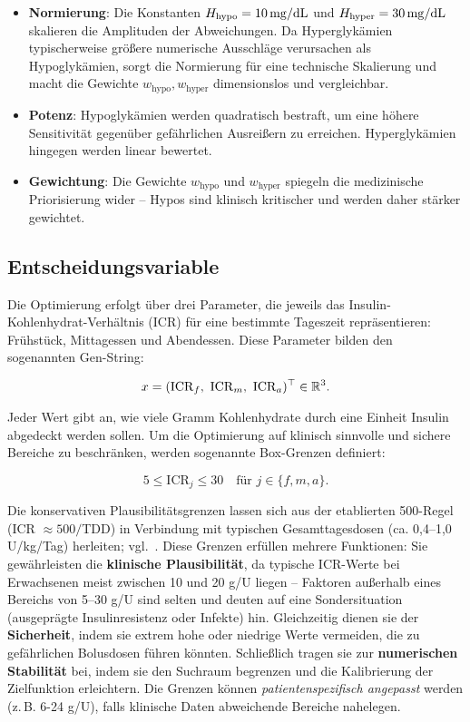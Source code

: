 \begin{itemize}
    \item \textbf{Normierung}: Die Konstanten \(H_{\text{hypo}} = 10\,\mathrm{mg/dL}\) und \(H_{\text{hyper}} = 30\,\mathrm{mg/dL}\) skalieren die Amplituden der Abweichungen. Da Hyperglykämien typischerweise größere numerische Ausschläge verursachen als Hypoglykämien, sorgt die Normierung für eine technische Skalierung und macht die Gewichte \(w_{\mathrm{hypo}}, w_{\mathrm{hyper}}\) dimensionslos und vergleichbar.
    \item \textbf{Potenz}: Hypoglykämien werden quadratisch bestraft, um eine höhere Sensitivität gegenüber gefährlichen Ausreißern zu erreichen. Hyperglykämien hingegen werden linear bewertet.
    \item \textbf{Gewichtung}: Die Gewichte \(w_{\mathrm{hypo}}\) und \(w_{\mathrm{hyper}}\) spiegeln die medizinische Priorisierung wider – Hypos sind klinisch kritischer und werden daher stärker gewichtet.
\end{itemize}

\subsection{Entscheidungsvariable}

Die Optimierung erfolgt über drei Parameter, die jeweils das Insulin-Kohlenhydrat-Verhältnis (ICR) für eine bestimmte Tageszeit repräsentieren: Frühstück, Mittagessen und Abendessen. Diese Parameter bilden den sogenannten Gen-String:

\[
x = (\mathrm{ICR}_f,\ \mathrm{ICR}_m,\ \mathrm{ICR}_a)^\top \in \mathbb{R}^3.
\]

\noindent Jeder Wert gibt an, wie viele Gramm Kohlenhydrate durch eine Einheit Insulin abgedeckt werden sollen. Um die Optimierung auf klinisch sinnvolle und sichere Bereiche zu beschränken, werden sogenannte Box-Grenzen definiert:

\[
5 \le \mathrm{ICR}_j \le 30 \quad \text{für } j \in \{f,m,a\}.
\]

\noindent Die konservativen Plausibilitätsgrenzen lassen sich aus der etablierten 500-Regel (ICR \(\approx 500/\)TDD) in Verbindung mit typischen Gesamttagesdosen (ca. 0{,}4--1{,}0\,U/kg/Tag) herleiten; vgl.\ \cite{walsh2016pumping,cengiz2022ispad,ada2024standards}.
\noindent Diese Grenzen erfüllen mehrere Funktionen: Sie gewährleisten die \textbf{klinische Plausibilität}, da typische ICR-Werte bei Erwachsenen meist zwischen 10 und 20 g/U liegen – Faktoren außerhalb eines Bereichs von 5–30 g/U sind selten und deuten auf eine Sondersituation (ausgeprägte Insulinresistenz oder Infekte) hin. Gleichzeitig dienen sie der \textbf{Sicherheit}, indem sie extrem hohe oder niedrige Werte vermeiden, die zu gefährlichen Bolusdosen führen könnten. Schließlich tragen sie zur \textbf{numerischen Stabilität} bei, indem sie den Suchraum begrenzen und die Kalibrierung der Zielfunktion erleichtern.
\noindent Die Grenzen können \emph{patientenspezifisch angepasst} werden (z.\,B. 6-24 g/U), falls klinische Daten abweichende Bereiche nahelegen.

